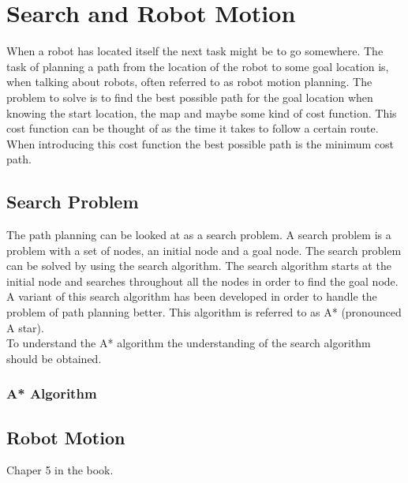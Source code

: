 
\section{Search and Robot Motion} %
\label{sec:search_and_robot_motion}

When a robot has located itself the next task might be to go somewhere. The task of planning a path from the location of the robot to some goal location is, when talking about robots, often referred to as robot motion planning. The problem to solve is to find the best possible path for the goal location when knowing the start location, the map and maybe some kind of cost function. This cost function can be thought of as the time it takes to follow a certain route. When introducing this cost function the best possible path is the minimum cost path. \\

\subsection{Search Problem} %
\label{sub:search_problem}

The path planning can be looked at as a search problem. A search problem is a problem with a set of nodes, an initial node and a goal node. The search problem can be solved by using the search algorithm. The search algorithm starts at the initial node and searches throughout all the nodes in order to find the goal node. A variant of this search algorithm has been developed in order to handle the problem of path planning better. This algorithm is referred to as A* (pronounced A star). \\

To understand the A* algorithm the understanding of the search algorithm should be obtained.

\subsubsection{A* Algorithm} %
\label{subsub:a_algorithm}




\subsection{Robot Motion} %
\label{sub:robot_motion}

Chaper 5 in the book.

